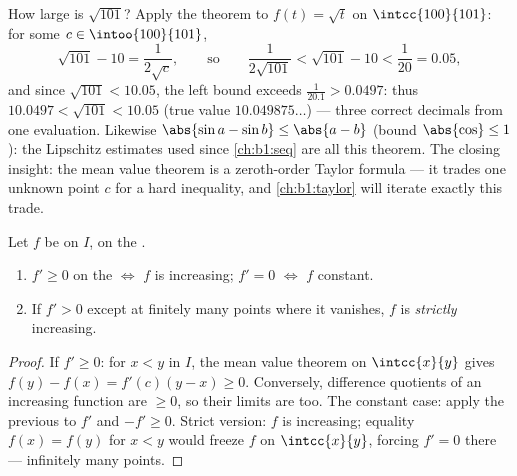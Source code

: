 \begin{example}\label{ex:b1:derivative:mvtestimate}
How large is $\sqrt{101}$? Apply the theorem to $f(t) = \sqrt t$
on $\intcc{100}{101}$: for some $c \in \intoo{100}{101}$,
\[
\sqrt{101} - 10 = \frac{1}{2\sqrt c},
\qquad\text{so}\qquad
\frac{1}{2\sqrt{101}} < \sqrt{101} - 10 < \frac{1}{20} = 0.05 ,
\]
and since $\sqrt{101} < 10.05$, the left bound exceeds
$\frac{1}{20.1} > 0.0497$: thus $10.0497 < \sqrt{101} < 10.05$
(true value $10.049875\dots$) --- three correct decimals from one
 evaluation. Likewise $\abs{\sin a - \sin b} \leq
\abs{a - b}$ (bound $\abs{\cos}\leq 1$): the Lipschitz estimates
used since \cref{ch:b1:seq} are all this theorem. The closing
insight: the mean value theorem is a zeroth-order Taylor formula
--- it trades one unknown point $c$ for a hard inequality, and
\cref{ch:b1:taylor} will iterate exactly this trade.
\end{example}

\begin{corollary}\label{cor:b1:derivative:monotone}
Let $f$ be  on $I$,  on the .
\begin{enumerate}
  \item $f' \geq 0$ on the  $\iff$ $f$ is increasing; $f' = 0$
        $\iff$ $f$ constant.
  \item If $f' > 0$ except at finitely many points where it vanishes,
        $f$ is \emph{strictly} increasing.
\end{enumerate}
\end{corollary}

\begin{proof}
If $f' \geq 0$: for $x < y$ in $I$, the mean value theorem on
$\intcc{x}{y}$ gives $f(y) - f(x) = f'(c)(y - x) \geq 0$. Conversely,
difference quotients of an increasing function are $\geq 0$, so their
limits are too. The constant case: apply the previous to $f'$ and
$-f' \geq 0$. Strict version: $f$ is increasing; equality $f(x) =
f(y)$ for $x < y$ would freeze $f$ on $\intcc{x}{y}$, forcing $f' =
0$ there --- infinitely many points.
\end{proof}

